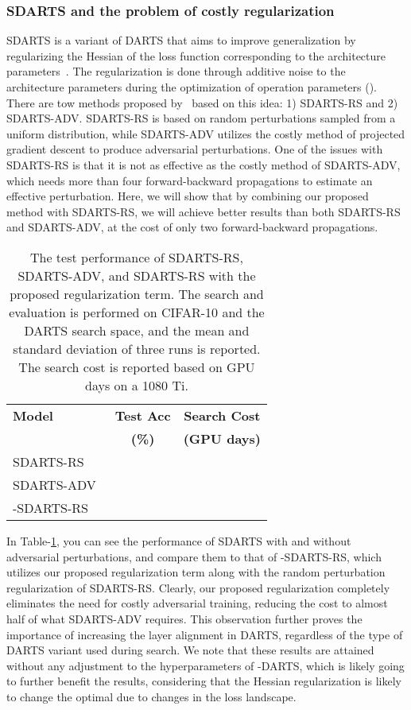 \documentclass{article} \usepackage{fancyhdr, iclr2023_conference, times}
\newcommand{\mydarts}{-DARTS\xspace}
\newcommand{\lambdafn}{layer alignment\xspace}
\begin{document}
\subsubsection{SDARTS and the problem of costly regularization}
\par SDARTS is a variant of DARTS that aims to improve generalization by regularizing the Hessian of the loss function corresponding to the architecture parameters~\citep{DBLP:conf/icml/ChenH20}. The regularization is done through additive noise to the architecture parameters during the optimization of operation parameters (). There are tow methods proposed by~\citep{DBLP:conf/icml/ChenH20} based on this idea: 1) SDARTS-RS and 2) SDARTS-ADV. SDARTS-RS is based on random perturbations sampled from a uniform distribution, while SDARTS-ADV utilizes the costly method of projected gradient descent to produce adversarial perturbations. One of the issues with SDARTS-RS is that it is not as effective as the costly method of SDARTS-ADV, which needs more than four forward-backward propagations to estimate an effective perturbation. Here, we will show that by combining our proposed method with SDARTS-RS, we will achieve better results than both SDARTS-RS and SDARTS-ADV, at the cost of only two forward-backward propagations.
\par \begin{table}[t]
\centering
\caption{The test performance of SDARTS-RS, SDARTS-ADV, and SDARTS-RS with the proposed regularization term. The search and evaluation is performed on CIFAR-10 and the DARTS search space, and the mean and standard deviation of three runs is reported. The search cost is reported based on GPU days on a 1080 Ti.} 
\label{table:sdarts}
\begin{tabular}{l|c|c}
\textbf{Model} &\textbf{Test Acc} & \textbf{Search Cost} \\ 
& \textbf{(\%)} & \textbf{(GPU days)} \\\hline
    SDARTS-RS~\citep{DBLP:conf/icml/ChenH20} &  & \\
    SDARTS-ADV~\citep{DBLP:journals/ijcv/ChenXWT21} &  & \\\hline
    -SDARTS-RS &  & 
\end{tabular}
\end{table} In Table-\ref{table:sdarts}, you can see the performance of SDARTS with and without adversarial perturbations, and compare them to that of -SDARTS-RS, which utilizes our proposed regularization term along with the random perturbation regularization of SDARTS-RS. Clearly, our proposed regularization completely eliminates the need for costly adversarial training, reducing the cost to almost half of what SDARTS-ADV requires. This observation further proves the importance of increasing the \lambdafn in DARTS, regardless of the type of DARTS variant used during search. We note that these results are attained without any adjustment to the hyperparameters of \mydarts, which is likely going to further benefit the results, considering that the Hessian regularization is likely to change the optimal  due to changes in the loss landscape.
\end{document}
